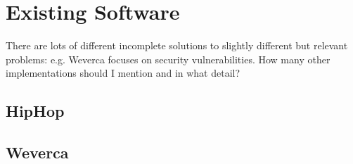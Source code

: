 \chapter{Existing Software}
    There are lots of different incomplete solutions to slightly different but relevant problems: 
    e.g. Weverca focuses on security vulnerabilities. How many other implementations should I mention and 
    in what detail?

    \section{HipHop}
    \section{Weverca}
